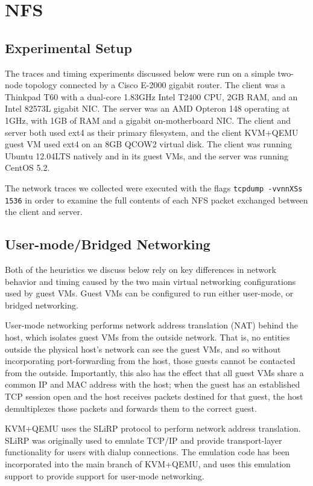 \documentclass[11pt,pdftex,twocolumn]{article}
\begin{document}
\section{NFS}

\subsection{Experimental Setup}
\label{subsec:expSetup}
The traces and timing experiments discussed below were run on a simple two-node topology connected by a Cisco E-2000 gigabit router. The client was a Thinkpad T60 with a dual-core 1.83GHz Intel T2400 CPU, 2GB RAM, and an Intel 82573L gigabit NIC. The server was an AMD Opteron 148 operating at 1GHz, with 1GB of RAM and a gigabit on-motherboard NIC. The client and server both used ext4 as their primary filesystem, and the client KVM+QEMU guest VM used ext4 on an 8GB QCOW2 virtual disk. The client was running Ubuntu 12.04LTS natively and in its guest VMs, and the server was running CentOS 5.2.

The network traces we collected were executed with the flags \texttt{tcpdump -vvnnXSs 1536} in order to examine the full contents of each NFS packet exchanged between the client and server.

\subsection{User-mode/Bridged Networking}
\label{subsec:networkIntro}
Both of the heuristics we discuss below rely on key differences in network behavior and timing caused by the two main virtual networking configurations used by guest VMs. Guest VMs can be configured to run either user-mode, or bridged networking.

User-mode networking performs network address translation (NAT) behind the host, which isolates guest VMs from the outside network. That is, no entities outside the physical host's network can see the guest VMs, and so without incorporating port-forwarding from the host, those guests cannot be contacted from the outside. Importantly, this also has the effect that all guest VMs share a common IP and MAC address with the host; when the guest has an established TCP session open and the host receives packets destined for that guest, the host demultiplexes those packets and forwards them to the correct guest. 

KVM+QEMU uses the SLiRP protocol to perform network address translation. SLiRP was originally used to emulate TCP/IP and provide transport-layer functionality for users with dialup connections. The emulation code has been incorporated into the main branch of KVM+QEMU, and uses this emulation support to provide support for user-mode networking.
\end{document}

